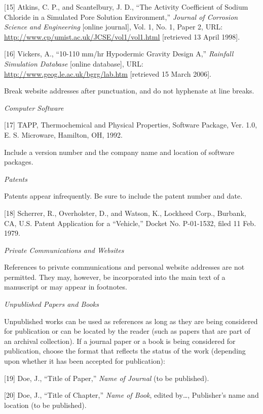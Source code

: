 \documentclass[
]{article}
\begin{document}
{[}15{]} Atkins, C. P., and Scantelbury, J. D., ``The Activity
Coefficient of Sodium Chloride in a Simulated Pore Solution
Environment,'' \emph{Journal of Corrosion Science and Engineering}
{[}online journal{]}, Vol. 1, No. 1, Paper 2, URL:
\href{http://www.cp/umist.ac.uk/JCSE/vol1/vol1.html}{\ul{http://www.cp/umist.ac.uk/JCSE/vol1/vol1.html}}
{[}retrieved 13 April 1998{]}.

{[}16{]} Vickers, A., ``10-110 mm/hr Hypodermic Gravity Design A,''
\emph{Rainfall Simulation Database} {[}online database{]}, URL:
\href{http://www.geog.le.ac.uk/bgrg/lab.htm}{\ul{http://www.geog.le.ac.uk/bgrg/lab.htm}}
{[}retrieved 15 March 2006{]}.

Break website addresses after punctuation, and do not hyphenate at line
breaks.

\emph{Computer Software}

{[}17{]} TAPP, Thermochemical and Physical Properties, Software Package,
Ver. 1.0, E. S. Microware, Hamilton, OH, 1992.

Include a version number and the company name and location of software
packages.

\emph{Patents}

Patents appear infrequently. Be sure to include the patent number and
date.

{[}18{]} Scherrer, R., Overholster, D., and Watson, K., Lockheed Corp.,
Burbank, CA, U.S. Patent Application for a ``Vehicle,'' Docket No.
P-01-1532, filed 11 Feb. 1979.

\emph{Private Communications and Websites}

References to private communications and personal website addresses are
not permitted. They may, however, be incorporated into the main text of
a manuscript or may appear in footnotes.

\emph{Unpublished Papers and Books}

Unpublished works can be used as references as long as they are being
considered for publication or can be located by the reader (such as
papers that are part of an archival collection). If a journal paper or a
book is being considered for publication, choose the format that
reflects the status of the work (depending upon whether it has been
accepted for publication):

{[}19{]} Doe, J., ``Title of Paper,'' \emph{Name of Journal} (to be
published).

{[}20{]} Doe, J., ``Title of Chapter,'' \emph{Name of Book}, edited
by\ldots, Publisher's name and location (to be published).
\end{document}
